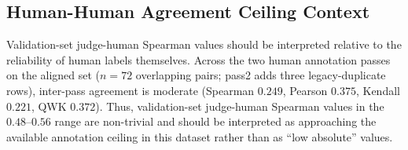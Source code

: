 \documentclass{article}
\begin{document}
\subsection{Human-Human Agreement Ceiling Context}
Validation-set judge-human Spearman values should be interpreted relative to the reliability of human labels themselves.
Across the two human annotation passes on the aligned set (\(n=72\) overlapping pairs; pass2 adds three legacy-duplicate rows), inter-pass agreement is moderate (Spearman \(0.249\), Pearson \(0.375\), Kendall \(0.221\), QWK \(0.372\)).
Thus, validation-set judge-human Spearman values in the \(0.48\)--\(0.56\) range are non-trivial and should be interpreted as approaching the available annotation ceiling in this dataset rather than as ``low absolute'' values.
\end{document}
